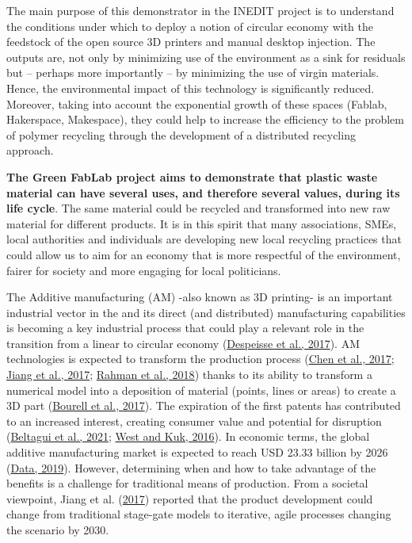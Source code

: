 \documentclass[
  11pt,
]{article}
\begin{document}
The main purpose of this demonstrator in the INEDIT project is to
understand the conditions under which to deploy a notion of circular
economy with the feedstock of the open source 3D printers and manual
desktop injection. The outputs are, not only by minimizing use of the
environment as a sink for residuals but -- perhaps more importantly --
by minimizing the use of virgin materials. Hence, the environmental
impact of this technology is significantly reduced. Moreover, taking
into account the exponential growth of these spaces (Fablab, Hakerspace,
Makespace), they could help to increase the efficiency to the problem of
polymer recycling through the development of a distributed recycling
approach.

\textbf{The Green FabLab project aims to demonstrate that plastic waste
material can have several uses, and therefore several values, during its
life cycle}. The same material could be recycled and transformed into
new raw material for different products. It is in this spirit that many
associations, SMEs, local authorities and individuals are developing new
local recycling practices that could allow us to aim for an economy that
is more respectful of the environment, fairer for society and more
engaging for local politicians.

The Additive manufacturing (AM) -also known as 3D printing- is an
important industrial vector in the and its direct (and distributed)
manufacturing capabilities is becoming a key industrial process that
could play a relevant role in the transition from a linear to circular
economy (\protect\hyperlink{ref-Despeisse2016}{Despeisse et al., 2017}).
AM technologies is expected to transform the production process
(\protect\hyperlink{ref-Chen2017}{Chen et al., 2017};
\protect\hyperlink{ref-Jiang2017}{Jiang et al., 2017};
\protect\hyperlink{ref-Rahman2018}{Rahman et al., 2018}) thanks to its
ability to transform a numerical model into a deposition of material
(points, lines or areas) to create a 3D part
(\protect\hyperlink{ref-Bourell2017}{Bourell et al., 2017}). The
expiration of the first patents has contributed to an increased
interest, creating consumer value and potential for disruption
(\protect\hyperlink{ref-Beltagui2020}{Beltagui et al., 2021};
\protect\hyperlink{ref-West2016a}{West and Kuk, 2016}). In economic
terms, the global additive manufacturing market is expected to reach USD
23.33 billion by 2026 (\protect\hyperlink{ref-ReportsAndData2019}{Data,
2019}). However, determining when and how to take advantage of the
benefits is a challenge for traditional means of production. From a
societal viewpoint, Jiang et al.
(\protect\hyperlink{ref-Jiang2017}{2017}) reported that the product
development could change from traditional stage-gate models to
iterative, agile processes changing the scenario by 2030.
\end{document}
